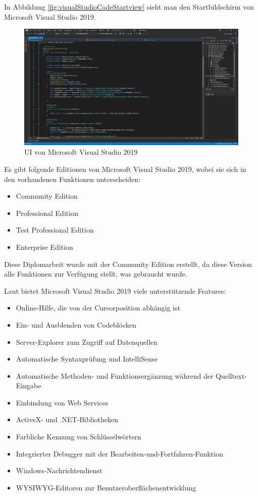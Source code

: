 In Abbildung \ref{fig:visualStudioCodeStartview} sieht man den Startbildschirm von Microsoft Visual Studio 2019.
\begin{figure}[H]
	\centerline{
		\includegraphics[width=1\textwidth, frame]{./grafiken/visual_studio_startview.png}
	}
	\vskip0pt
	\caption{UI von Microsoft Visual Studio 2019} \label{fig:visualStudioStartview}
\end{figure}

Es gibt folgende Editionen von Microsoft Visual Studio 2019, wobei sie sich in den vorhandenen Funktionen unterscheiden:
\begin{itemize}
	\item Community Edition
	\item Professional Edition
	\item Test Professional Edition
	\item Enterprise Edition
\end{itemize}

Diese Diplomarbeit wurde mit der Community Edition erstellt, da diese Version alle Funktionen zur Verfügung stellt, was gebraucht wurde. \autocite{wikiVisualStudio}

Laut \autocite{wikiVisualStudio} bietet Microsoft Visual Studio 2019 viele unterstützende Features:

\begin{itemize}
	\item Online-Hilfe, die von der Cursorposition abhängig ist
	\item Ein- und Ausblenden von Codeblöcken
	\item Server-Explorer zum Zugriff auf Datenquellen
	\item Automatische Syntaxprüfung und IntelliSense
	\item Automatische Methoden- und Funktionsergänzung während der Quelltext-Eingabe
	\item Einbindung von Web Services
	\item ActiveX- und .NET-Bibliotheken
	\item Farbliche Kennung von Schlüsselwörtern
	\item Integrierter Debugger mit der Bearbeiten-und-Fortfahren-Funktion
	\item Windows-Nachrichtendienst
	\item WYSIWYG-Editoren zur Benutzeroberflächenentwicklung
\end{itemize}
